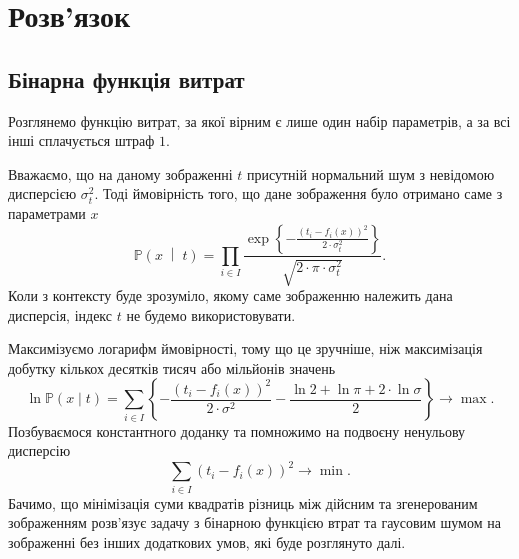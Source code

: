 \section{Розв'язок}

\subsection{Бінарна функція витрат}

Розглянемо функцію витрат,
за якої вірним є лише один набір параметрів,
а за всі інші сплачується штраф $1$.

Вважаємо, що на даному зображенні $t$
присутній нормальний шум з невідомою дисперсією $\sigma^2_t$.
Тоді ймовірність того,
що дане зображення було отримано саме з параметрами $x$
\begin{equation*}
  \mathbb{P}\left( x \;\middle|\; t \right)
  = \prod_{i \in I}
    \frac{\exp{\left\{- \frac{\left( t_i - f_i\left( x \right) \right)^2}
           {2 \cdot \sigma^2_t} \right\}}}
           {\sqrt{2 \cdot \pi \cdot \sigma^2_t}}.
\end{equation*}
Коли з контексту буде зрозуміло,
якому саме зображенню належить дана дисперсія,
індекс $t$ не будемо використовувати.

Максимізуємо логарифм ймовірності,
тому що це зручніше,
ніж максимізація добутку кількох десятків тисяч або мільйонів значень
\begin{equation*}
  \ln{\mathbb{P}\left( x \mid t \right)}
  = \sum_{i \in I}
    \left\{
      - \frac{\left( t_i - f_i\left( x \right) \right)^2}{2 \cdot \sigma^2}
      - \frac{\ln{2} + \ln{\pi} + 2 \cdot \ln{\sigma}}{2}
    \right\}
  \to \max.
\end{equation*}
Позбуваємося константного доданку та помножимо на подвоєну ненульову дисперсію
\begin{equation*}
  \sum_{i \in I} \left( t_i - f_i\left( x \right) \right)^2 \to \min.
\end{equation*}
Бачимо,
що мінімізація суми квадратів різниць між дійсним та згенерованим зображенням
розв'язує задачу з бінарною функцією втрат
та гаусовим шумом на зображенні без інших додаткових умов,
які буде розглянуто далі.

